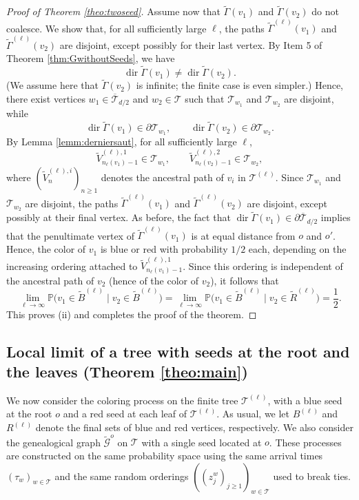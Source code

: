 \documentclass[french]{article}
\newcommand{\zi}{z}
\renewcommand{\P}{\mathbb{P}}
\newcommand{\T}{\mathcal{T}}
\renewcommand{\dir}{\mathop{dir}}
\renewcommand{\1}{\mathds{1}}
\begin{document}
\begin{proof}[Proof of Theorem \ref{theo:twoseed}]
Assume now that $\tilde{\Gamma}(v_1)$ and $\tilde{\Gamma}(v_2)$ do not coalesce. We show that, for all sufficiently large $\ell$, the paths $\tilde{\Gamma}^{(\ell)}(v_1)$ and $\tilde{\Gamma}^{(\ell)}(v_2)$ are disjoint, except possibly for their last vertex. By Item 5 of Theorem \ref{thm:GwithoutSeeds}, we have
$$
\dir \tilde{\Gamma}(v_1)\neq \dir \tilde{\Gamma}(v_2).
$$
(We assume here that $\tilde{\Gamma}(v_2)$ is infinite; the finite case is even simpler.) Hence, there exist vertices $w_1\in \overline{\T}_{d/2}$ and $w_2\in \T$ such that $\T_{w_1}$ and $\T_{w_2}$ are disjoint, while
$$
\dir \tilde{\Gamma}(v_1)\in \partial \T_{w_1},
\qquad
\dir \tilde{\Gamma}(v_2)\in \partial \T_{w_2}.
$$
By Lemma \ref{lemm:derniersaut}, for all sufficiently large $\ell$,
$$
\tilde{V}^{(\ell),1}_{n_\ell(v_1)-1}\in {\T}_{w_1},
\qquad
\tilde{V}^{(\ell),2}_{n_\ell(v_2)-1}\in {\T}_{w_2},
$$
where $(\tilde{V}_n^{(\ell),i})_{n\ge1}$ denotes the ancestral path of $v_i$ in $\T^{(\ell)}$. Since $\T_{w_1}$ and $\T_{w_2}$ are disjoint, the paths $\tilde{\Gamma}^{(\ell)}(v_1)$ and $\tilde{\Gamma}^{(\ell)}(v_2)$ are disjoint, except possibly at their final vertex. As before, the fact that $\dir \tilde{\Gamma}(v_1)\in \partial \overline{\T}_{d/2}$ implies that the penultimate vertex of $\tilde{\Gamma}^{(\ell)}(v_1)$ is at equal distance from $o$ and $o'$. Hence, the color of $v_1$ is blue or red with probability $1/2$ each, depending on the increasing ordering attached to $\tilde{V}^{(\ell),1}_{n_\ell(v_1)-1}$. Since this ordering is independent of the ancestral path of $v_2$ (hence of the color of $v_2$), it follows that
$$
\lim_{\ell \to \infty}\P\bigl(v_1\in \tilde{B}^{(\ell)} \mid v_2\in \tilde{B}^{(\ell)}\bigr)=\lim_{\ell \to \infty}\P\bigl(v_1\in \tilde{B}^{(\ell)} \mid v_2\in \tilde{R}^{(\ell)}\bigr)
=
\frac12.
$$
This proves (ii) and completes the proof of the theorem.
\end{proof}






\subsection{Local limit of a tree with seeds at the root and the leaves (Theorem \ref{theo:main})}

We now consider the coloring process on the finite tree $\T^{(\ell)}$, with a blue seed at the root $o$ and a red seed at each leaf of $\T^{(\ell)}$. As usual, we let $B^{(\ell)}$ and $R^{(\ell)}$ denote the final sets of blue and red vertices, respectively.
We also consider the genealogical graph $\tilde{\mathcal{G}}^{o}$ on $\T$ with a single seed located at $o$. These processes are constructed on the same probability space using the same arrival times $(\tau_w)_{w\in \T}$ and the same random orderings $((\zi_j^w)_{j\ge 1})_{w\in \T}$ used to break ties.
\medskip
\end{document}
